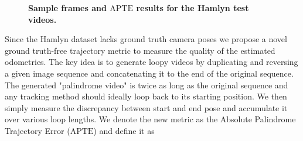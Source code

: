 \documentclass{article}
\begin{document}
\begin{figure}[!b]
  \centering
  \newcommand{\imgheight}{3.1cm}
    \vspace{-8pt}
  \caption{\textbf{Sample frames and $\mathrm{APTE}$ results for the Hamlyn test videos.}}
  \label{fig:hamlyn}
\end{figure}
Since the Hamlyn dataset lacks ground truth camera poses we propose a novel ground truth-free trajectory metric to measure the quality of the estimated odometries. 
The key idea is to generate loopy videos by duplicating and reversing a given image sequence and concatenating it to the end of the original sequence.
The generated "palindrome video" is twice as long as the original sequence and any tracking method should ideally loop back to its starting position. We then simply measure the discrepancy between start and end pose and accumulate it over various loop lengths.
We denote the new metric as the Absolute Palindrome Trajectory Error ($\mathrm{APTE}$) and define it as
\end{document}
